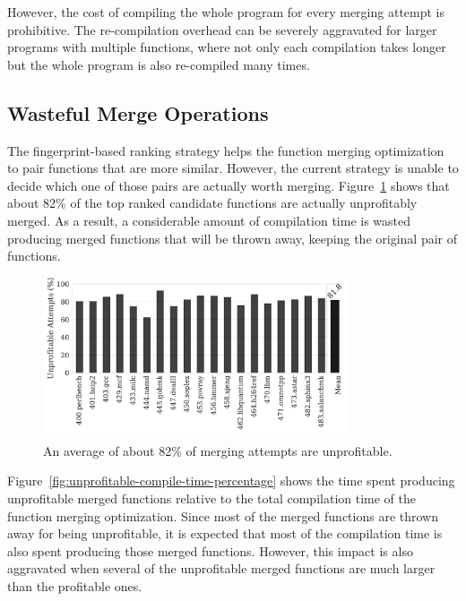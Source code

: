 However, the cost of compiling the whole program for every merging attempt is prohibitive.
The re-compilation overhead can be severely aggravated for larger programs with multiple functions, where not only each compilation takes longer but the whole program is also re-compiled many times.

\subsection{Wasteful Merge Operations}

The fingerprint-based ranking strategy helps the function merging optimization to pair functions that are more similar.
However, the current strategy is unable to decide which one of those pairs are actually worth merging.
Figure~\ref{fig:unprofitable-attempts} shows that about 82\% of the top ranked candidate functions are actually unprofitably merged.
As a result, a considerable amount of compilation time is wasted producing merged functions that will be thrown away, keeping the original pair of functions.

\begin{figure}[h]
  \centering
  \includegraphics[width=0.8\textwidth]{src/deeplearning/figs/unprofitable-attempts.pdf}
  \caption{An average of about 82\% of merging attempts are unprofitable.}
  \label{fig:unprofitable-attempts}
\end{figure}


Figure~\ref{fig:unprofitable-compile-time-percentage} shows the time spent producing unprofitable merged functions relative to the total compilation time of the function merging optimization.
Since most of the merged functions are thrown away for being unprofitable, it is expected that most of the compilation time is also spent producing those merged functions.
However, this impact is also aggravated when several of the unprofitable merged functions are much larger than the profitable ones.

